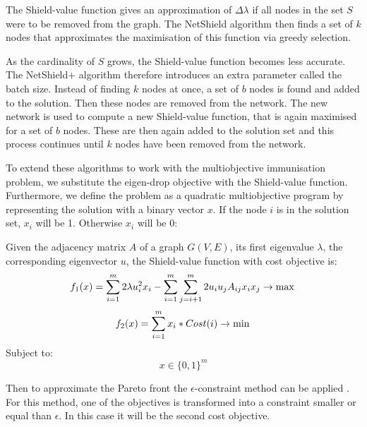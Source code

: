 \documentclass{svproc}
\begin{document}
The Shield-value function gives an approximation of $\Delta\lambda$ if all nodes in the set $S$ were to be removed from the graph. The NetShield algorithm then finds a set of $k$ nodes that approximates the maximisation of this function via greedy selection.

As the cardinality of $S$ grows, the Shield-value function becomes less accurate. The NetShield+ algorithm therefore introduces an extra parameter called the batch size. Instead of finding $k$ nodes at once, a set of $b$ nodes is found and added to the solution. Then these nodes are removed from the network. The new network is used to compute a new Shield-value function, that is again maximised for a set of $b$ nodes. These are then again added to the solution set and this process continues until $k$ nodes have been removed from the network.

To extend these algorithms to work with the multiobjective immunisation problem, we substitute the eigen-drop objective with the Shield-value function. Furthermore, we define the problem as a quadratic multiobjective program by representing the solution with a binary vector $x$. If the node $i$ is in the solution set, $x_i$ will be 1. Otherwise $x_i$ will be 0:

\begin{definition}
Given the adjacency matrix $A$ of a graph $G(V,E)$, its first eigenvalue $\lambda$, the corresponding eigenvector $u$, the Shield-value function with cost objective is:
\begin{equation}
    f_{1}(x) = \sum_{i=1}^{m} 2 \lambda  u_{i}^{2} x_{i} - \sum_{i=1}^{m} \sum_{j=i+1}^{m} 2 u_{i} u_{j} A_{ij} x_{i} x_{j} \to \max \\
\end{equation}
\begin{equation}
    f_{2}(x) = \sum_{i=1}^{m} x_{i} * Cost(i) \to \min\\
\end{equation}
Subject to:
\begin{equation}
x \in \{0,1\}^{m}
\end{equation}
\end{definition}

Then to approximate the Pareto front the $\epsilon$-constraint method can be applied \cite{KaisaNMO}. For this method, one of the objectives is transformed into a constraint smaller or equal than $\epsilon$. In this case it will be the second cost objective.
\end{document}
